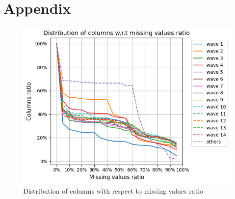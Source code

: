 \documentclass[]{article}
\begin{document}
\cleardoublepage
\appendix
\section{Appendix}
\begin{figure}[!h]
	\centering
	\includegraphics[scale = 0.75]{distribution_of_columns_wrt_missing_values_ratio.png}
	\caption{Distribution of columns with respect to missing values ratio}
	\label{distribution_of_columns_wrt_missing_values_ratio}
\end{figure}
\end{document}

